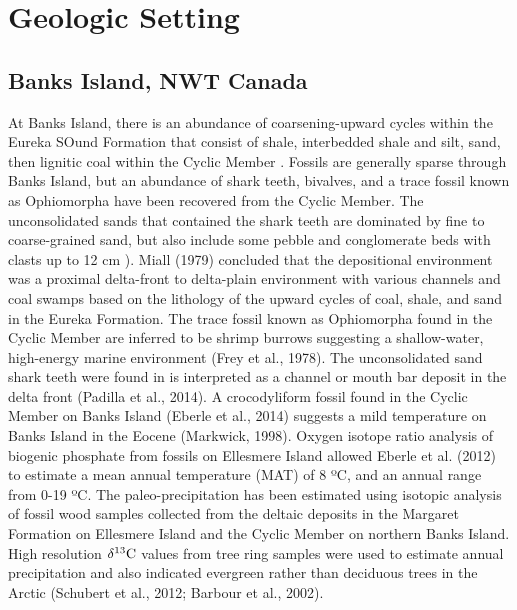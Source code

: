 \documentclass[]{rsos}%
\begin{document}





\pagebreak

\section{Geologic Setting}

\subsection{Banks Island, NWT Canada}
At Banks Island, there is an abundance of coarsening-upward cycles within the Eureka SOund Formation that consist of shale, interbedded shale and silt, sand, then lignitic coal within the Cyclic Member \cite{Padilla2014}. 
Fossils are generally sparse through Banks Island, but an abundance of shark teeth, bivalves, and a trace fossil known as Ophiomorpha \cite{Miall1979, Padilla2014} have been recovered from the Cyclic Member. 
The unconsolidated sands that contained the shark teeth are dominated by fine to coarse-grained sand, but also include some pebble and conglomerate beds with clasts up to 12 cm \cite{Miall1979}). 
Miall (1979) concluded that the depositional environment was a proximal delta-front to delta-plain environment with various channels and coal swamps based on the lithology of the upward cycles of coal, shale, and sand in the Eureka Formation. 
The trace fossil known as Ophiomorpha found in the Cyclic Member \cite{Miall1979, Eberle2012} are inferred to be shrimp burrows suggesting a shallow-water, high-energy marine environment (Frey et al., 1978). 
The unconsolidated sand shark teeth were found in is interpreted as a channel or mouth bar deposit in the delta front (Padilla et al., 2014). 
A crocodyliform fossil found in the Cyclic Member on Banks Island (Eberle et al., 2014) suggests a mild temperature on Banks Island in the Eocene (Markwick, 1998). 
Oxygen isotope ratio analysis of biogenic phosphate from fossils on Ellesmere Island allowed Eberle et al. (2012) to estimate a mean annual temperature (MAT) of 8 ºC, and an annual range from 0-19 ºC. 
The paleo-precipitation has been estimated using isotopic analysis of fossil wood samples collected from the deltaic deposits in the Margaret Formation on Ellesmere Island and the Cyclic Member on northern Banks Island. High resolution $\delta^{13}{\rm C}$ values from tree ring samples were used to estimate annual precipitation and also indicated evergreen rather than deciduous trees in the Arctic (Schubert et al., 2012; Barbour et al., 2002). 
\end{document}
